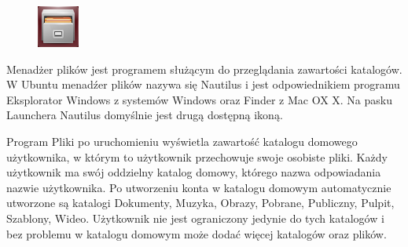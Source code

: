 \begin{figure}
                \includegraphics[width=\linewidth]{images/ikony_pliki.png}
\end{figure}

Menadżer plików jest programem służącym do przeglądania zawartości katalogów. W Ubuntu menadźer plików nazywa się \textcolor{ubuntu_orange}{Nautilus} i jest odpowiednikiem programu \textcolor{ubuntu_orange}{Eksplorator Windows} z systemów Windows oraz \textcolor{ubuntu_orange}{Finder} z Mac OX X. Na pasku Launchera Nautilus domyślnie jest drugą dostępną ikoną. 

Program Pliki po uruchomieniu wyświetla zawartość katalogu domowego użytkownika, w którym to użytkownik przechowuje swoje osobiste pliki. Każdy użytkownik ma swój oddzielny katalog domowy, którego nazwa odpowiadania nazwie użytkownika. Po utworzeniu konta w katalogu domowym automatycznie utworzone są katalogi Dokumenty, Muzyka, Obrazy, Pobrane, Publiczny, Pulpit, Szablony, Wideo. Użytkownik nie jest ograniczony jedynie do tych katalogów i bez problemu w katalogu domowym może dodać więcej katalogów oraz plików.


